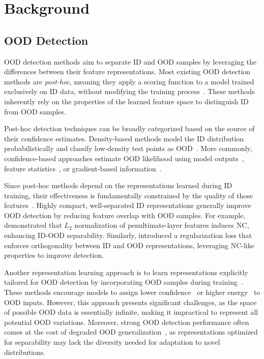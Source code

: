 \section{Background}
\label{sec:background}
\subsection{OOD Detection}
\vspace{-0.5em}

OOD detection methods aim to separate ID and OOD samples by leveraging the differences between their feature representations. Most existing OOD detection methods are \emph{post-hoc}, meaning they apply a scoring function to a model trained exclusively on ID data, without modifying the training process~\cite{salehi2022a}. These methods inherently rely on the properties of the learned feature space to distinguish ID from OOD samples.

Post-hoc detection techniques can be broadly categorized based on the source of their confidence estimates. Density-based methods model the ID distribution probabilistically and classify low-density test points as OOD~\cite{lee2018simple, zisselman2020deep, choi2018waic, jiang2023diverse}. More commonly, confidence-based approaches estimate OOD likelihood using model outputs~\cite{hendrycks2016baseline, liang2017enhancing, liu2020energy}, feature statistics~\cite{sun2021react, zhu2022boosting, sun2022out}, or gradient-based information~\cite{huang2021importance, wu2024low, lee2023probing, igoe2022useful}.

Since post-hoc methods depend on the representations learned during ID training, their effectiveness is fundamentally constrained by the quality of those features~\cite{roady2020open}. Highly compact, well-separated ID representations generally improve OOD detection by reducing feature overlap with OOD samples. For example, \citet{haas2023linking} demonstrated that $L_2$ normalization of penultimate-layer features induces NC, enhancing ID-OOD separability. Similarly, \citet{wu2024pursuing} introduced a regularization loss that enforces orthogonality between ID and OOD representations, leveraging NC-like properties to improve detection.

Another representation learning approach is to learn representations explicitly tailored for OOD detection by incorporating OOD samples during training~\cite{wu2024pursuing, bai2023feed, katz2022training, ming2022poem}. These methods encourage models to assign lower confidence~\cite{hendrycks2018deep} or higher energy~\cite{liu2020energy} to OOD inputs. However, this approach presents significant challenges, as the space of possible OOD data is essentially infinite, making it impractical to represent all potential OOD variations. Moreover, strong OOD detection performance often comes at the cost of degraded OOD generalization~\cite{zhang2024best}, as representations optimized for separability may lack the diversity needed for adaptation to novel distributions.



